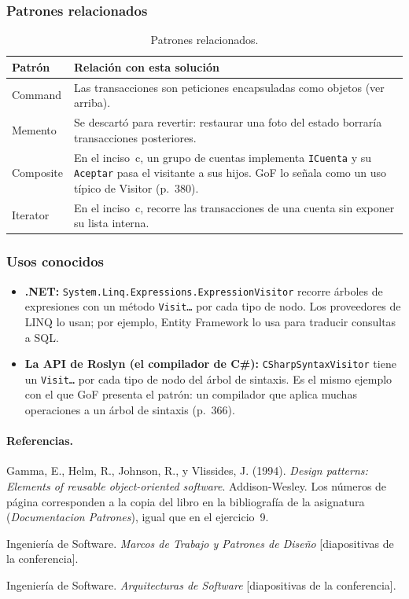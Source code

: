 \subsubsection{Patrones relacionados}

\begin{table}[H]
\centering
\small
\begin{tabularx}{\textwidth}{>{\raggedright\arraybackslash}p{2.3cm} >{\raggedright\arraybackslash}X}
\toprule
\textbf{Patrón} & \textbf{Relación con esta solución} \\
\midrule
Command & Las transacciones son peticiones encapsuladas como objetos (ver arriba). \\
\addlinespace
Memento & Se descartó para revertir: restaurar una foto del estado borraría transacciones
          posteriores. \\
\addlinespace
Composite & En el inciso~c, un grupo de cuentas implementa \texttt{ICuenta} y su
            \texttt{Aceptar} pasa el visitante a sus hijos. GoF lo señala como un uso típico
            de Visitor (p.~380). \\
\addlinespace
Iterator & En el inciso~c, recorre las transacciones de una cuenta sin exponer su lista
           interna. \\
\bottomrule
\end{tabularx}
\caption{Patrones relacionados.}
\end{table}

\subsubsection{Usos conocidos}

\begin{itemize}
  \item \textbf{.NET:} \texttt{System.Linq.Expressions.ExpressionVisitor} recorre árboles de
        expresiones con un método \texttt{Visit\ldots} por cada tipo de nodo. Los proveedores
        de LINQ lo usan; por ejemplo, Entity Framework lo usa para traducir consultas a SQL.
  \item \textbf{La API de Roslyn (el compilador de C\#):} \texttt{CSharpSyntaxVisitor} tiene un
        \texttt{Visit\ldots} por cada tipo de nodo del árbol de sintaxis. Es el mismo ejemplo
        con el que GoF presenta el patrón: un compilador que aplica muchas operaciones a un
        árbol de sintaxis (p.~366).
\end{itemize}

\paragraph{Referencias.}
Gamma, E., Helm, R., Johnson, R., y Vlissides, J. (1994). \emph{Design patterns: Elements of
reusable object-oriented software}. Addison-Wesley. Los números de página corresponden a la
copia del libro en la bibliografía de la asignatura (\emph{Documentacion Patrones}), igual que
en el ejercicio~9.

Ingeniería de Software. \emph{Marcos de Trabajo y Patrones de Diseño} [diapositivas de la
conferencia].

Ingeniería de Software. \emph{Arquitecturas de Software} [diapositivas de la conferencia].
